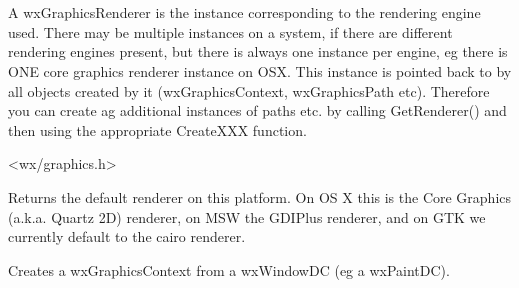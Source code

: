 
\section{}\label{wxgraphicsrenderer}

A wxGraphicsRenderer is the instance corresponding to the rendering engine used. There may be multiple instances on a system, if there are different rendering engines present, but there is always one instance per engine, eg there is ONE core graphics renderer instance on OSX. This instance is pointed back to by all objects created by it (wxGraphicsContext, wxGraphicsPath etc). Therefore you can create ag additional instances of paths etc. by calling GetRenderer() and then using the appropriate CreateXXX function.




<wx/graphics.h>





\label{wxgraphicsrenderergetdefaultrenderer}


Returns the default renderer on this platform. On OS X this is the Core Graphics (a.k.a. Quartz 2D) renderer, on MSW the GDIPlus renderer, and on GTK we currently default to the cairo renderer.

\label{wxgraphicsrenderercreatecontext}


Creates a wxGraphicsContext from a wxWindowDC (eg a wxPaintDC).

